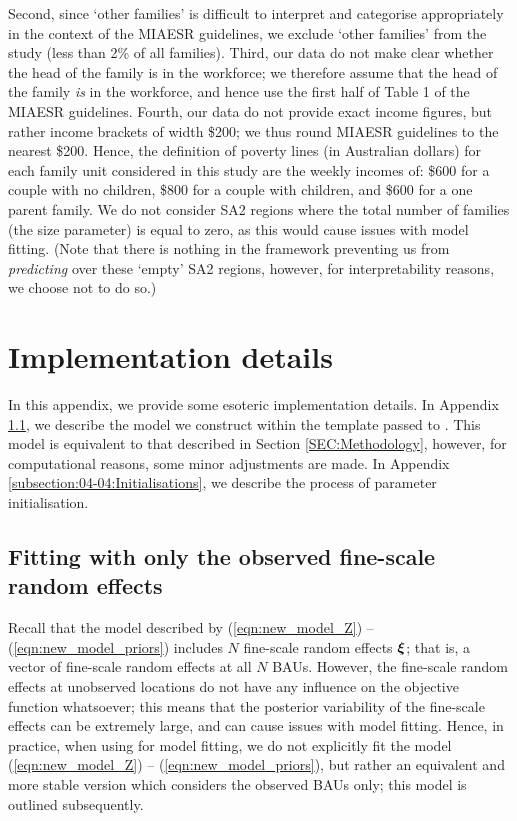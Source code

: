 \documentclass[nojss]{jss}
\def\mbf#1{{%
\mathchoice%
{\hbox{\boldmath$\displaystyle{#1}$}}%
{\hbox{\boldmath$\textstyle{#1}$}}%
{\hbox{\boldmath$\scriptstyle{#1}$}}%
{\hbox{\boldmath$\scriptscriptstyle{#1}$}}%
}}
\def\vec{\mbf}
\begin{document}
\begin{appendix}
Second, since `other families' is difficult to interpret and categorise appropriately in the context of the MIAESR guidelines, we exclude `other families' from the study (less than 2\% of all families). 
Third, our data do not make clear whether the head of the family is in the workforce; we therefore assume that the head of the family \textit{is} in the workforce, and hence use the first half of Table 1 of the MIAESR guidelines.
Fourth, our data do not provide exact income figures, but rather income brackets of width \$200; we thus round MIAESR guidelines to the nearest \$200. 
Hence, the definition of poverty lines (in Australian dollars) for each family unit considered in this study are the weekly incomes of: \$600 for a couple with no children, \$800 for a couple with children, and \$600 for a one parent family. 
We do not consider SA2 regions where the total number of families (the size parameter) is equal to zero, as this would cause issues with model fitting.
(Note that there is nothing in the framework preventing us from \textit{predicting} over these `empty' SA2 regions, however, for interpretability reasons, we choose not to do so.)


\section{Implementation details}\label{appendix:implementation_details}

In this appendix, we provide some esoteric implementation details. In Appendix \ref{appendix:implementation_details:fitting_with_only_observed_fine-scale}, we describe the model we construct within the  template passed to . 
This model is equivalent to that described in Section \ref{SEC:Methodology}, however, for computational reasons, some minor adjustments are made. 
In Appendix \ref{subsection:04-04:Initialisations}, we describe the process of parameter initialisation. 


\subsection{Fitting with only the observed fine-scale random effects}\label{appendix:implementation_details:fitting_with_only_observed_fine-scale}

Recall that the model described by (\ref{eqn:new_model_Z}) -- (\ref{eqn:new_model_priors}) includes $N$ fine-scale random effects $\vec{\xi}$; that is, a vector of fine-scale random effects at all $N$ BAUs. 
However, the fine-scale random effects at unobserved locations do not have any influence on the objective function whatsoever; this means that the posterior variability of the fine-scale effects can be extremely large, and can cause issues with model fitting.
Hence, in practice, when using  for model fitting, we do not explicitly fit the model (\ref{eqn:new_model_Z}) -- (\ref{eqn:new_model_priors}), but rather an equivalent and more stable version which considers the observed BAUs only; this model is outlined subsequently. 


\end{appendix}
\end{document}
